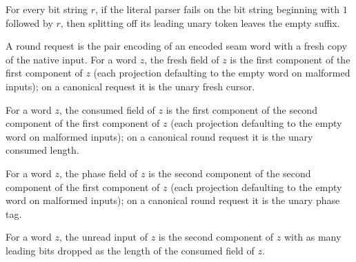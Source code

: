 \begin{lemma}
\label{Complexity.satToken_failure}
\leanok
{}
For every bit string $r$, if the literal parser fails on the bit string beginning with
$1$ followed by $r$, then splitting off its leading unary token leaves the empty suffix.
\end{lemma}

\begin{definition}
\label{Complexity.satReqFresh}
\leanok
{}
A round request is the pair encoding of an encoded seam word with a fresh copy of
the native input. For a word $z$, the fresh field of $z$ is the first component of
the first component of $z$ (each projection defaulting to the empty word on
malformed inputs); on a canonical request it is the unary fresh cursor.
\end{definition}

\begin{definition}
\label{Complexity.satReqUsed}
\leanok
{}
For a word $z$, the consumed field of $z$ is the first component of the second
component of the first component of $z$ (each projection defaulting to the empty
word on malformed inputs); on a canonical round request it is the unary consumed
length.
\end{definition}

\begin{definition}
\label{Complexity.satReqPhase}
\leanok
{}
For a word $z$, the phase field of $z$ is the second component of the second
component of the first component of $z$ (each projection defaulting to the empty
word on malformed inputs); on a canonical round request it is the unary phase tag.
\end{definition}

\begin{definition}
\label{Complexity.satReqRest}
\leanok
{}
For a word $z$, the unread input of $z$ is the second component of $z$ with as
many leading bits dropped as the length of the consumed field of $z$.
\end{definition}

